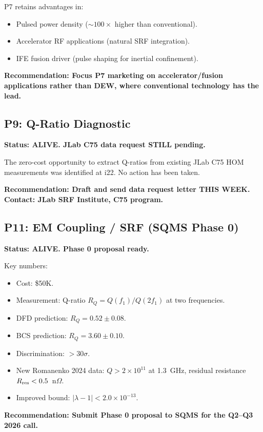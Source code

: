 \documentclass[11pt]{article}
\newcommand{\ee}[1]{\times 10^{#1}}
\begin{document}
P7 retains advantages in:
\begin{itemize}
\item Pulsed power density ($\sim 100\times$ higher than conventional).
\item Accelerator RF applications (natural SRF integration).
\item IFE fusion driver (pulse shaping for inertial confinement).
\end{itemize}

\textbf{Recommendation: Focus P7 marketing on accelerator/fusion
applications rather than DEW, where conventional technology has the
lead.}

\subsection{P9: Q-Ratio Diagnostic}

\textbf{Status: ALIVE.  JLab C75 data request STILL pending.}

The zero-cost opportunity to extract Q-ratios from existing JLab C75
HOM measurements was identified at i22.  No action has been taken.

\textbf{Recommendation: Draft and send data request letter THIS WEEK.
Contact: JLab SRF Institute, C75 program.}

\subsection{P11: EM Coupling / SRF (SQMS Phase 0)}

\textbf{Status: ALIVE.  Phase 0 proposal ready.}

Key numbers:
\begin{itemize}
\item Cost: \$50K.
\item Measurement: Q-ratio $R_Q = Q(f_1)/Q(2f_1)$ at two frequencies.
\item DFD prediction: $R_Q = 0.52 \pm 0.08$.
\item BCS prediction: $R_Q = 3.60 \pm 0.10$.
\item Discrimination: $> 30\sigma$.
\item New Romanenko 2024 data: $Q > 2\ee{11}$ at 1.3~GHz, residual
  resistance $R_{\rm res} < 0.5$~n$\Omega$.
\item Improved bound: $|\lambda - 1| < 2.0\ee{-13}$.
\end{itemize}

\textbf{Recommendation: Submit Phase 0 proposal to SQMS for the
Q2--Q3 2026 call.}
\end{document}
